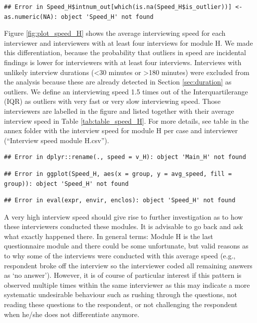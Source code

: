 \documentclass[
  11pt,
  a4paperpaper,
]{article}
\begin{document}
\begin{verbatim}
## Error in Speed_H$intnum_out[which(is.na(Speed_H$is_outlier))] <- as.numeric(NA): object 'Speed_H' not found
\end{verbatim}

Figure \ref{fig:plot_speed_H} shows the average interviewing speed for
each interviewer and interviewers with at least four interviews for
module H. We made this differentiation, because the probability that
outliers in speed are incidental findings is lower for interviewers with
at least four interviews. Interviews with unlikely interview durations
(\textless30 minutes or \textgreater180 minutes) were excluded from the
analysis because these are already detected in Section
\ref{sec:duration} as outliers. We define an interviewing speed 1.5
times out of the Interquartilerange (IQR) as outliers with very fast or
very slow interviewing speed. Those interviewers are labelled in the
figure and listed together with their average interview speed in Table
\ref{tab:table_speed_H}. For more details, see table in the annex folder
with the interview speed for module H per case and interviewer
(``Interview speed module H.csv'').

\begin{verbatim}
## Error in dplyr::rename(., speed = v_H): object 'Main_H' not found
\end{verbatim}

\begin{verbatim}
## Error in ggplot(Speed_H, aes(x = group, y = avg_speed, fill = group)): object 'Speed_H' not found
\end{verbatim}

\begin{verbatim}
## Error in eval(expr, envir, enclos): object 'Speed_H' not found
\end{verbatim}

A very high interview speed should give rise to further investigation as
to how these interviewers conducted these modules. It is advisable to go
back and ask what exactly happened there. In general terms: Module H is
the last questionnaire module and there could be some unfortunate, but
valid reasons as to why some of the interviews were conducted with this
average speed (e.g., respondent broke off the interview so the
interviewer coded all remaining answers as `no answer'). However, it is
of course of particular interest if this pattern is observed multiple
times within the same interviewer as this may indicate a more systematic
undesirable behaviour such as rushing through the questions, not reading
these questions to the respondent, or not challenging the respondent
when he/she does not differentiate anymore.
\end{document}
